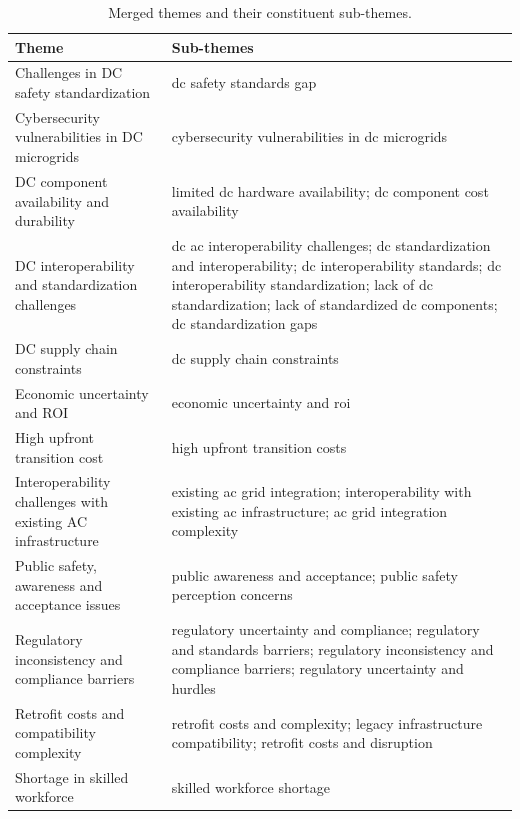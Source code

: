 \begin{table}
\caption{Merged themes and their constituent sub-themes.}
\label{tab:theme_subthemes}
\begin{tabular}{ll}
\toprule
Theme & Sub-themes \\
\midrule
Challenges in DC safety standardization & dc safety standards gap \\
Cybersecurity vulnerabilities in DC microgrids & cybersecurity vulnerabilities in dc microgrids \\
DC component availability and durability & limited dc hardware availability; dc component cost availability \\
DC interoperability and standardization challenges & dc ac interoperability challenges; dc standardization and interoperability; dc interoperability standards; dc interoperability standardization; lack of dc standardization; lack of standardized dc components; dc standardization gaps \\
DC supply chain constraints & dc supply chain constraints \\
Economic uncertainty and ROI & economic uncertainty and roi \\
High upfront transition cost & high upfront transition costs \\
Interoperability challenges with existing AC infrastructure & existing ac grid integration; interoperability with existing ac infrastructure; ac grid integration complexity \\
Public safety, awareness and acceptance issues & public awareness and acceptance; public safety perception concerns \\
Regulatory inconsistency and compliance barriers & regulatory uncertainty and compliance; regulatory and standards barriers; regulatory inconsistency and compliance barriers; regulatory uncertainty and hurdles \\
Retrofit costs and compatibility complexity & retrofit costs and complexity; legacy infrastructure compatibility; retrofit costs and disruption \\
Shortage in skilled workforce & skilled workforce shortage \\
\bottomrule
\end{tabular}
\end{table}
